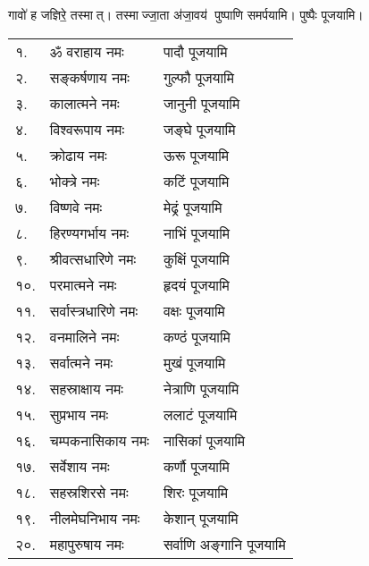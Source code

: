 {गावो॑ ह जज्ञिरे॒ तस्मात्। तस्माज्जा॒ता अ॑जा॒वय॑}
  पुष्पाणि समर्पयामि।  पुष्पैः पूजयामि।

\begin{longtable}{ll@{— }l}
१.& ॐ वराहाय नमः & पादौ पूजयामि \\
२.& सङ्कर्षणाय नमः & गुल्फौ पूजयामि\\
३.& कालात्मने नमः & जानुनी पूजयामि  \\
४.& विश्वरूपाय नमः & जङ्घे पूजयामि\\
५.& क्रोढाय नमः & ऊरू पूजयामि   \\
६.& भोक्त्रे नमः & कटिं पूजयामि \\
७.& विष्णवे नमः & मेढ्रं पूजयामि        \\
८.& हिरण्यगर्भाय नमः & नाभिं पूजयामि\\
९.& श्रीवत्सधारिणे नमः & कुक्षिं पूजयामि    \\
१०.& परमात्मने नमः & हृदयं पूजयामि\\
११.& सर्वास्त्रधारिणे नमः & वक्षः पूजयामि   \\
१२.& वनमालिने नमः & कण्ठं पूजयामि\\
१३.& सर्वात्मने नमः & मुखं पूजयामि  \\
१४.&     सहस्राक्षाय नमः & नेत्राणि पूजयामि\\
१५.& सुप्रभाय नमः & ललाटं पूजयामि   \\
१६.& चम्पकनासिकाय नमः & नासिकां पूजयामि \\
१७.& सर्वेशाय नमः & कर्णौ पूजयामि   \\
१८.& सहस्रशिरसे नमः & शिरः पूजयामि\\
१९.& नीलमेघनिभाय नमः & केशान् पूजयामि   \\
२०.& महापुरुषाय नमः & सर्वाणि अङ्गानि पूजयामि   \\
\end{longtable}

